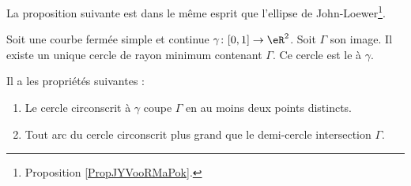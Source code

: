 La proposition suivante est dans le même esprit que l'ellipse de John-Loewer\footnote{Proposition \ref{PropJYVooRMaPok}.}.
\begin{propositionDef}      \label{PROPDEFooCWESooVbDven} 
    Soit une courbe fermée simple et continue \( \gamma\colon \mathopen[ 0 , 1 \mathclose]\to \eR^2\). Soit \( \Gamma\) son image. Il existe un unique cercle de rayon minimum contenant \( \Gamma\). Ce cercle est le  à \( \gamma\).

    Il a les propriétés suivantes :
    \begin{enumerate}
        \item
            Le cercle circonscrit à \( \gamma\) coupe \( \Gamma\) en au moins deux points distincts.
        \item
            Tout arc du cercle circonscrit plus grand que le demi-cercle intersection \( \Gamma\).
    \end{enumerate}
\end{propositionDef}

